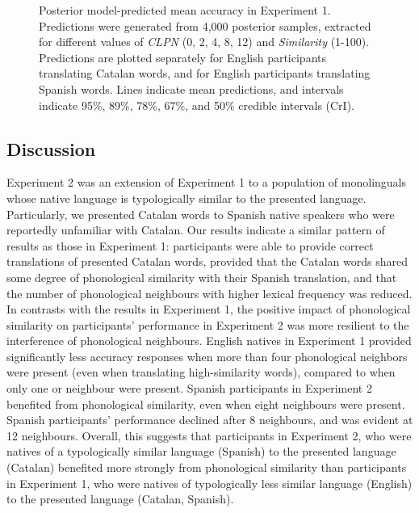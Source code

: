 \documentclass[
]{article}
\begin{document}
\begin{figure}


\caption{\label{fig-epreds-2}Posterior model-predicted mean accuracy in
Experiment 1. Predictions were generated from 4,000 posterior samples,
extracted for different values of \emph{CLPN} (0, 2, 4, 8, 12) and
\emph{Similarity} (1-100). Predictions are plotted separately for
English participants translating Catalan words, and for English
participants translating Spanish words. Lines indicate mean predictions,
and intervals indicate 95\%, 89\%, 78\%, 67\%, and 50\% credible
intervals (CrI).}

\end{figure}%

\subsection{Discussion}\label{discussion-1}

Experiment 2 was an extension of Experiment 1 to a population of
monolinguals whose native language is typologically similar to the
presented language. Particularly, we presented Catalan words to Spanish
native speakers who were reportedly unfamiliar with Catalan. Our results
indicate a similar pattern of results as those in Experiment 1:
participants were able to provide correct translations of presented
Catalan words, provided that the Catalan words shared some degree of
phonological similarity with their Spanish translation, and that the
number of phonological neighbours with higher lexical frequency was
reduced. In contrasts with the results in Experiment 1, the positive
impact of phonological similarity on participants' performance in
Experiment 2 was more resilient to the interference of phonological
neighbours. English natives in Experiment 1 provided significantly less
accuracy responses when more than four phonological neighbors were
present (even when translating high-similarity words), compared to when
only one or neighbour were present. Spanish participants in Experiment 2
benefited from phonological similarity, even when eight neighbours were
present. Spanish participants' performance declined after 8 neighbours,
and was evident at 12 neighbours. Overall, this suggests that
participants in Experiment 2, who were natives of a typologically
similar language (Spanish) to the presented language (Catalan) benefited
more strongly from phonological similarity than participants in
Experiment 1, who were natives of typologically less similar language
(English) to the presented language (Catalan, Spanish).
\end{document}
